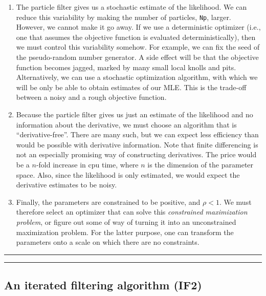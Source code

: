 \documentclass[]{article}
\begin{document}
\begin{enumerate}
\def\labelenumi{\arabic{enumi}.}
\item
  The particle filter gives us a stochastic estimate of the likelihood.
  We can reduce this variability by making the number of particles,
  \texttt{Np}, larger. However, we cannot make it go away. If we use a
  deterministic optimizer (i.e., one that assumes the objective function
  is evaluated deterministically), then we must control this variability
  somehow. For example, we can fix the seed of the pseudo-random number
  generator. A side effect will be that the objective function becomes
  jagged, marked by many small local knolls and pits. Alternatively, we
  can use a stochastic optimization algorithm, with which we will be
  only be able to obtain estimates of our MLE. This is the trade-off
  between a noisy and a rough objective function.
\item
  Because the particle filter gives us just an estimate of the
  likelihood and no information about the derivative, we must choose an
  algorithm that is ``derivative-free''. There are many such, but we can
  expect less efficiency than would be possible with derivative
  information. Note that finite differencing is not an especially
  promising way of constructing derivatives. The price would be a
  \(n\)-fold increase in cpu time, where \(n\) is the dimension of the
  parameter space. Also, since the likelihood is only estimated, we
  would expect the derivative estimates to be noisy.
\item
  Finally, the parameters are constrained to be positive, and
  \(\rho < 1\). We must therefore select an optimizer that can solve
  this \emph{constrained maximization problem}, or figure out some of
  way of turning it into an unconstrained maximization problem. For the
  latter purpose, one can transform the parameters onto a scale on which
  there are no constraints.
\end{enumerate}

\begin{center}\rule{0.5\linewidth}{\linethickness}\end{center}

\begin{center}\rule{0.5\linewidth}{\linethickness}\end{center}

\subsection{An iterated filtering algorithm
(IF2)}\label{an-iterated-filtering-algorithm-if2}
\end{document}
